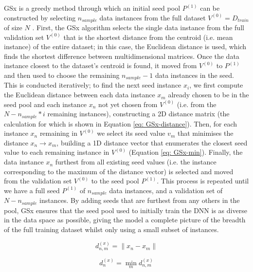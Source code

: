 \documentclass[a4paper, 11pt]{report}
\begin{document}
    GSx is a greedy method through which an initial seed pool $P^{(1)}$ can be constructed by selecting $n_{sample}$ data instances from the full dataset $V^{(0)} = D_{train}$ of size $N$ \citep{wu-2019}. First, the GSx algorithm selects the single data instance from the full validation set $V^{(0)}$ that is the shortest distance from the centroid (i.e. mean instance) of the entire dataset; in this case, the Euclidean distance is used, which finds the shortest difference between multidimensional matrices. Once the data instance closest to the dataset's centroid is found, it moved from $V^{(0)}$ to $P^{(1)}$ and then used to choose the remaining $n_{sample} - 1$ data instances in the seed. This is conducted iteratively; to find the next seed instance $x_i$, we first compute the Euclidean distance between each data instance $x_m$ already chosen to be in the seed pool and each instance $x_n$ not yet chosen from $V^{(0)}$ (i.e. from the $N - n_{sample} * i$ remaining instances), constructing a 2D distance matrix (the calculation for which is shown in Equation \ref{eq: GSx-distance}). Then, for each instance $x_n$ remaining in $V^{(0)}$ we select its seed value $v_m$ that minimises the distance $x_n \to x_m$, building a 1D distance vector that enumerates the closest seed value to each remaining instance in $V^{(0)}$ (Equation \ref{eq: GSx-min}). Finally, the data instance $x_n$ furthest from all existing seed values (i.e. the instance corresponding to the maximum of the distance vector) is selected and moved from the validation set $V^{(0)}$ to the seed pool $P^{(1)}$. This process is repeated until we have a full seed $P^{(1)}$ of $n_{sample}$ data instances, and a validation set of $N - n_{sample}$ instances. By adding seeds that are furthest from any others in the pool, GSx ensures that the seed pool used to initially train the DNN is as diverse in the data space as possible, giving the model a complete picture of the breadth of the full training dataset whilst only using a small subset of instances.


    \begin{equation}
        \label{eq: GSx-distance}
        d^{(x)}_{n, m} = \lVert x_n - x_m \lVert
    \end{equation}
  
    \begin{equation}
        \label{eq: GSx-min}
        d^{(x)}_n = \min_m d^{(x)}_{n, m}
    \end{equation}
\end{document}
